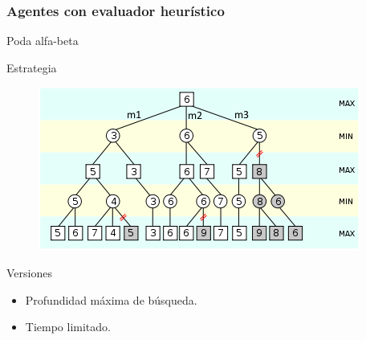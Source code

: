 \documentclass[10pt]{beamer}
\begin{document}
\begin{frame}[squeeze]
\frametitle{Agentes con evaluador heurístico}

{\huge Poda alfa-beta}
\begin{block}{Estrategia}
\begin{figure}[t]
\centering
\includegraphics[scale=0.5]{imagenes/podaalfabeta.png}
\label{fig:jug_podaAlfaBeta}
\end{figure}
\end{block}

{\footnotesize 
\begin{exampleblock}{Versiones}
\begin{itemize}
	\item Profundidad máxima de búsqueda. %
	\item Tiempo limitado.	%
\end{itemize}
\end{exampleblock}
}

\end{frame}
\end{document}
